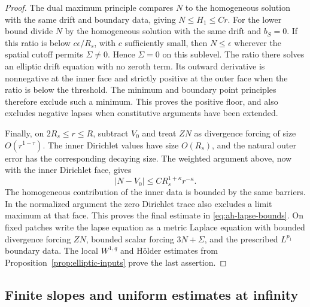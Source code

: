 \begin{proof}
The dual maximum principle compares \(N\) to the homogeneous
solution with the same drift and boundary data, giving
\(N\le H_1\le Cr\).  For the lower bound divide \(N\) by the
homogeneous solution with the same drift and \(b_S=0\).
If this ratio is below \(c\epsilon/R_s\), with \(c\) sufficiently
small, then \(N\le\epsilon\) wherever the spatial cutoff permits
\(\Sigma\ne0\).  Hence \(\Sigma=0\) on this sublevel.  The ratio
there solves an elliptic drift equation with no zeroth term.
Its outward derivative is nonnegative at the inner face and
strictly positive at the outer face when the ratio is below
the threshold.  The minimum and boundary point principles
therefore exclude such a minimum.  This proves the positive
floor, and also excludes negative lapses when constitutive
arguments have been extended.

Finally, on \(2R_s\le r\le R\), subtract \(V_0\) and treat \(ZN\)
as divergence forcing of size \(O(r^{1-\tau})\).
The inner Dirichlet values have size \(O(R_s)\), and the natural
outer error has the corresponding decaying size.  The weighted
argument above, now with the inner Dirichlet face, gives
\[
 |N-V_0|\le C R_s^{1+\kappa}r^{-\kappa}.
\]
The homogeneous contribution of the inner data is bounded by
the same barriers.  In the normalized argument the zero
Dirichlet trace also excludes a limit maximum at that face.
This proves the final estimate in \eqref{eq:ah-lapse-bounds}.
On fixed patches write the lapse equation as a metric Laplace
equation with bounded divergence forcing \(ZN\), bounded scalar
forcing \(3N+\Sigma\), and the prescribed \(L^{p_1}\) boundary
data.  The local \(W^{1,q}\) and Hölder estimates from
Proposition~\ref{prop:elliptic-inputs} prove the last assertion.
\end{proof}

\subsection{Finite slopes and uniform estimates at infinity}


